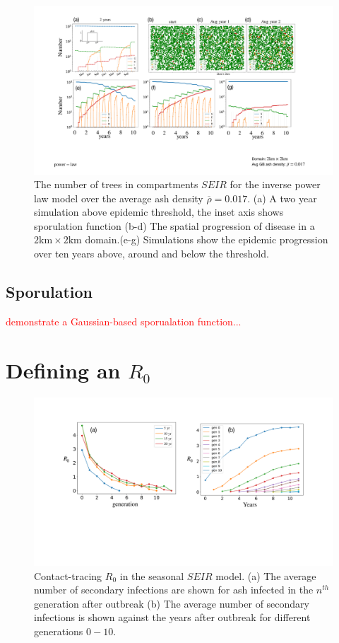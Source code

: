 \begin{landscape}
\begin{figure}
    \centering
    \includegraphics[scale=0.45]{chapter6/figures/fig4-seir.pdf}
    \caption{The number of trees in compartments $SEIR$ for the inverse power law model over the average ash density $\overline{\rho} = 0.017$. (a) A two year simulation above epidemic threshold, the inset axis shows sporulation function (b-d) The spatial progression of disease in a $2\mathrm{km} \times 2\mathrm{km}$ domain.(e-g) Simulations show the epidemic progression over ten years above, around and below the threshold.}
    \label{fig:SEIR-spread}
\end{figure}
\end{landscape}

\subsection{Sporulation}
\textcolor{red}{demonstrate a Gaussian-based sporualation function...}

\section{Defining an $R_0$}

\begin{figure}
    \centering
    \includegraphics[scale=0.3]{chapter6/figures/fig5-R0-def.pdf}
    \caption{Contact-tracing $R_0$ in the seasonal $SEIR$ model. (a) The average number of secondary infections are shown for ash infected in the $n^{th}$ generation after outbreak (b) The average number of secondary infections is shown against the years after outbreak for different generations $0-10$.}
    \label{fig:SEIR-R0-definition}
\end{figure}

